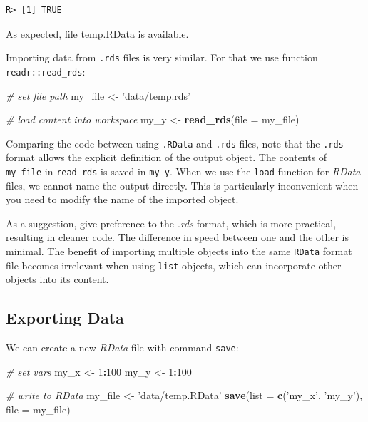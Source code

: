 \documentclass[
  12pt,
]{book}
\newenvironment{Shaded}{\begin{snugshade}}{\end{snugshade}}
\newcommand{\CommentTok}[1]{\textcolor[rgb]{0.37,0.37,0.37}{\textit{#1}}}
\newcommand{\DataTypeTok}[1]{\textcolor[rgb]{0.27,0.27,0.27}{#1}}
\newcommand{\DecValTok}[1]{\textcolor[rgb]{0.06,0.06,0.06}{#1}}
\newcommand{\KeywordTok}[1]{\textcolor[rgb]{0.27,0.27,0.27}{\textbf{#1}}}
\newcommand{\NormalTok}[1]{#1}
\newcommand{\OperatorTok}[1]{\textcolor[rgb]{0.43,0.43,0.43}{\textbf{#1}}}
\newcommand{\StringTok}[1]{\textcolor[rgb]{0.5,0.5,0.5}{#1}}
\newenvironment{rmdimportant}
{\begin{importantblock}
		
	} {\end{importantblock}}
\begin{document}
\begin{verbatim}
R> [1] TRUE
\end{verbatim}

As expected, file temp.RData is available.

Importing data from \texttt{.rds} files is very similar. For that we use function \texttt{readr::read\_rds}:

\begin{Shaded}
\begin{Highlighting}[]
\CommentTok{# set file path}
\NormalTok{my_file <-}\StringTok{ 'data/temp.rds'}

\CommentTok{# load content into workspace}
\NormalTok{my_y <-}\StringTok{ }\KeywordTok{read_rds}\NormalTok{(}\DataTypeTok{file =}\NormalTok{ my_file)}
\end{Highlighting}
\end{Shaded}

Comparing the code between using \texttt{.RData} and \texttt{.rds} files, note that the \texttt{.rds} format allows the explicit definition of the output object. The contents of \texttt{my\_file} in \texttt{read\_rds} is saved in \texttt{my\_y}. When we use the \texttt{load} function for \emph{RData} files, we cannot name the output directly. This is particularly inconvenient when you need to modify the name of the imported object.

\begin{rmdimportant}
As a suggestion, give preference to the \emph{.rds} format, which is
more practical, resulting in cleaner code. The difference in speed
between one and the other is minimal. The benefit of importing multiple
objects into the same \texttt{RData} format file becomes irrelevant when
using \texttt{list} objects, which can incorporate other objects into
its content.
\end{rmdimportant}

\hypertarget{exporting-data-2}{%
\subsection{Exporting Data}\label{exporting-data-2}}

We can create a new \emph{RData} file with command \texttt{save}:

\begin{Shaded}
\begin{Highlighting}[]
\CommentTok{# set vars}
\NormalTok{my_x <-}\StringTok{ }\DecValTok{1}\OperatorTok{:}\DecValTok{100}
\NormalTok{my_y <-}\StringTok{ }\DecValTok{1}\OperatorTok{:}\DecValTok{100}

\CommentTok{# write to RData}
\NormalTok{my_file <-}\StringTok{ 'data/temp.RData'}
\KeywordTok{save}\NormalTok{(}\DataTypeTok{list =} \KeywordTok{c}\NormalTok{(}\StringTok{'my_x'}\NormalTok{, }\StringTok{'my_y'}\NormalTok{),}
     \DataTypeTok{file =}\NormalTok{ my_file)}
\end{Highlighting}
\end{Shaded}
\end{document}
